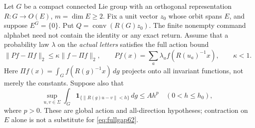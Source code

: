 Let $G$ be a compact connected Lie group with an orthogonal
representation $R:G\to O(E)$, $m=\dim E\ge2$. Fix a unit vector
$z_0$ whose orbit spans $E$, and suppose $E^G=\{0\}$. Put
$Q=\operatorname{conv}(R(G)z_0)$. The finite nonempty command alphabet
need not contain the identity or any exact return. Assume that a
probability law $\lambda$ on the \emph{actual letters} satisfies the
full action bound
\begin{equation}\label{eq:fullgap62}
 \|Pf-\Pi f\|_2\le\kappa\|f-\Pi f\|_2,\qquad
 Pf(x)=\sum_a\lambda_a f(R(u_a)^{-1}x),\qquad \kappa<1.
\end{equation}
Here $\Pi f(x)=\int_Gf(R(g)^{-1}x)\,dg$ projects onto all invariant
functions, not merely the constants. Suppose also that
\begin{equation}\label{eq:caps62}
 \sup_{u,v\in\Sigma}\int_G
   \boldsymbol1_{\{\|R(g)u-v\|<h\}}\,dg\le Ah^p
                         \quad(0<h\le h_0),
\end{equation}
where $p>0$. These are global action and all-direction hypotheses;
contraction on $E$ alone is not a substitute for \eqref{eq:fullgap62}.

